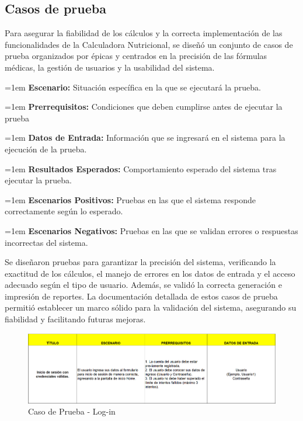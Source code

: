 \documentclass[12pt,letterpaper,spanish, xcolor=table]{report}
\numberwithin{figure}{subsection}
\begin{document}
\subsection{Casos de prueba}
	
	Para asegurar la fiabilidad de los cálculos y la correcta implementación de las funcionalidades de la Calculadora Nutricional, se diseñó un conjunto de casos de prueba organizados por épicas y centrados en la precisión de las fórmulas médicas, la gestión de usuarios y la usabilidad del sistema.\\

	{\leftskip=1em 
		\noindent 
		\textbf{Escenario:} Situación específica en la que se ejecutará la prueba.
		\par}
	
	{\leftskip=1em 
		\noindent 
		\textbf{Prerrequisitos:} Condiciones que deben cumplirse antes de ejecutar la prueba
		\par}
	
	{\leftskip=1em 
		\noindent 
		\textbf{Datos de Entrada:} Información que se ingresará en el sistema para la ejecución de la prueba.
		\par}
	
	{\leftskip=1em 
		\noindent 
		\textbf{Resultados Esperados:} Comportamiento esperado del sistema tras ejecutar la prueba.
		\par}
	
	{\leftskip=1em 
		\noindent 
		\textbf{Escenarios Positivos:} Pruebas en las que el sistema responde correctamente según lo esperado.
		\par}
	
	{\leftskip=1em 
		\noindent 
		\textbf{Escenarios Negativos:} Pruebas en las que se validan errores o respuestas incorrectas del sistema.\\
		\par}


	Se diseñaron pruebas para garantizar la precisión del sistema, verificando la exactitud de los cálculos, el manejo de errores en los datos de entrada y el acceso adecuado según el tipo de usuario. Además, se validó la correcta generación e impresión de reportes. La documentación detallada de estos casos de prueba permitió establecer un marco sólido para la validación del sistema, asegurando su fiabilidad y facilitando futuras mejoras.\\
	
	
	\begin{figure}[H]
		\centering
		\includegraphics[width=1.0\textwidth]
		{Imagenes/CalculadoraNutricional/CPLogin.png}
		\caption{Caso de Prueba - Log-in
		}\label{a2}
	\end{figure}
	
\end{document}
